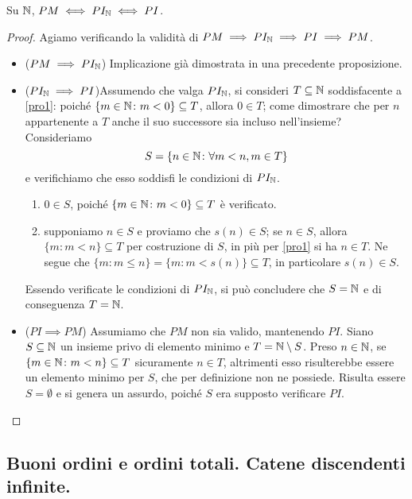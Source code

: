 \begin{thm}
  Su \(\mathbb{N}\), \(PM \iff PI_{\mathbb{N}} \iff PI\).
\end{thm}
\begin{proof}
  Agiamo verificando la validità di \(PM \implies PI_{\mathbb{N}} \implies PI \implies PM\).
  \begin{itemize}
    \item{(\(PM \implies PI_{\mathbb{N}}\))\quad} Implicazione già dimostrata in una precedente proposizione.
    \item{(\(PI_{\mathbb{N}} \implies PI\))\quad}Assumendo che valga \(PI_{\mathbb{N}}\), si consideri \(T \subseteq \mathbb{N}\) soddisfacente a \eqref{pro1}: poiché \(\lbrace m \in \mathbb{N} \colon m < 0\rbrace \subseteq T\), allora \(0 \in T\); come dimostrare che per \(n\) appartenente a \(T\) anche il suo successore sia incluso nell'insieme? Consideriamo
    \[
    S = \lbrace n \in \mathbb{N} \colon \forall m < n, m \in T\rbrace
    \]
    e verifichiamo che esso soddisfi le condizioni di \(PI_{\mathbb{N}}\).
    \begin{enumerate}
      \item \(0 \in S\), poiché \(\lbrace m \in \mathbb{N} \colon m < 0\rbrace \subseteq T\) è verificato.
      \item supponiamo \(n \in S\) e proviamo che \(s(n) \in S\); se \(n \in S\), allora \(\lbrace m \colon m < n\rbrace \subseteq T\) per costruzione di \(S\), in più per \eqref{pro1} si ha \(n \in T\). Ne segue che \(\lbrace m \colon m \le n\rbrace = \lbrace m \colon m < s(n)\rbrace \subseteq T\), in particolare \(s(n) \in S\).
    \end{enumerate}
    Essendo verificate le condizioni di \(PI_{\mathbb{N}}\), si può concludere che \(S = \mathbb{N}\) e di conseguenza \(T = \mathbb{N}\).

    \item{(\(PI \implies PM\))\quad} Assumiamo che \(PM\) non sia valido, mantenendo \(PI\). Siano \(S \subseteq \mathbb{N}\) un insieme privo di elemento minimo e \(T = \mathbb{N} \setminus S\). Preso \(n \in \mathbb{N}\), se \(\lbrace m \in \mathbb{N} \colon m < n\rbrace \subseteq T\) sicuramente \(n \in T\), altrimenti esso risulterebbe essere un elemento minimo per \(S\), che per definizione non ne possiede. Risulta essere \(S = \emptyset\) e si genera un assurdo, poiché \(S\) era supposto verificare \(PI\).
\end{itemize}
  \end{proof}

\subsection{Buoni ordini e ordini totali. Catene discendenti infinite.}

